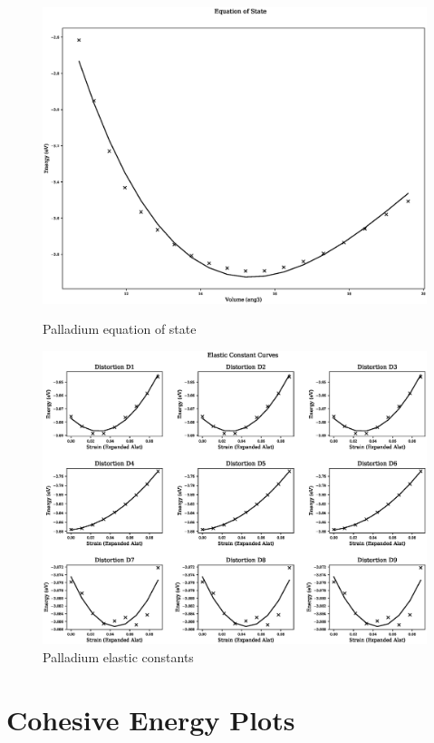\begin{figure}[ht] 
  \begin{minipage}[b]{0.4\linewidth}
    \centering
    \includegraphics[width=.9\linewidth]{chapters/results_potential_fitting/pot_fepd_fcc_1/pd_eos_1.eps} 
    \caption{Palladium equation of state}  
  \end{minipage}%
  \begin{minipage}[b]{0.4\linewidth}
    \centering
    \includegraphics[width=.9\linewidth]{chapters/results_potential_fitting/pot_fepd_fcc_1/pd_ec_1.eps} 
    \caption{Palladium elastic constants}  
  \end{minipage}%
\end{figure}




\FloatBarrier
\section{Cohesive Energy Plots}
\label{section:fepdv1coh}

